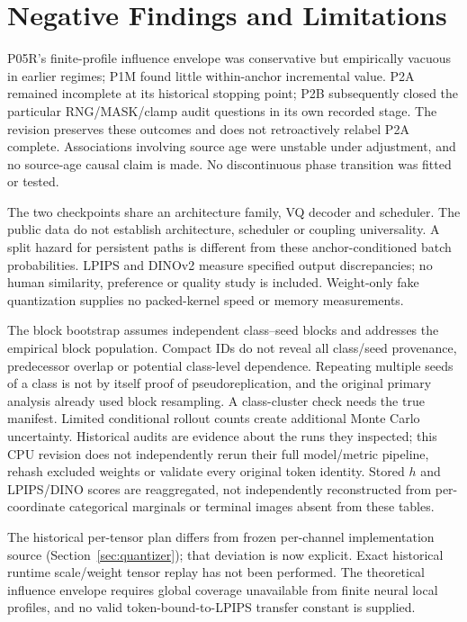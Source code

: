 \documentclass[11pt,a4paper]{article}
\theoremstyle{plain}
\theoremstyle{definition}
\theoremstyle{remark}
\begin{document}
\section{Negative Findings and Limitations}
\label{sec:limitations}
P05R's finite-profile influence envelope was conservative but empirically
vacuous in earlier regimes; P1M found little within-anchor incremental value.
P2A remained incomplete at its historical stopping point; P2B subsequently
closed the particular RNG/MASK/clamp audit questions in its own recorded stage.
The revision preserves these outcomes and does not retroactively relabel P2A
complete. Associations involving source age were unstable under adjustment,
and no source-age causal claim is made. No discontinuous phase transition was
fitted or tested.

The two checkpoints share an architecture family, VQ decoder and scheduler.
The public data do not establish architecture, scheduler or coupling universality.
A split hazard for persistent paths is different from these anchor-conditioned
batch probabilities. LPIPS and DINOv2 measure specified output discrepancies;
no human similarity, preference or quality study is included. Weight-only fake
quantization supplies no packed-kernel speed or memory measurements.

The block bootstrap assumes independent class--seed blocks and addresses the
empirical block population. Compact IDs do not reveal all class/seed provenance,
predecessor overlap or potential class-level dependence. Repeating multiple seeds
of a class is not by itself proof of pseudoreplication, and the original primary
analysis already used block resampling. A class-cluster check needs the true
manifest. Limited conditional rollout counts create additional Monte Carlo
uncertainty. Historical audits are evidence about the runs they inspected;
this CPU revision does not independently rerun their full model/metric pipeline,
rehash excluded weights or validate every original token identity. Stored $h$
and LPIPS/DINO scores are reaggregated, not independently reconstructed from
per-coordinate categorical marginals or terminal images absent from these tables.

The historical per-tensor plan differs from frozen per-channel implementation
source (Section~\ref{sec:quantizer}); that deviation is now explicit. Exact
historical runtime scale/weight tensor replay has not been performed. The theoretical influence
envelope requires global coverage unavailable from finite neural local profiles,
and no valid token-bound-to-LPIPS transfer constant is supplied.
\end{document}
